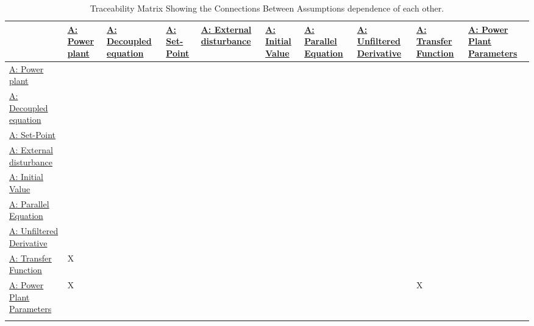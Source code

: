 \documentclass[12pt]{article}
\begin{document}
\begin{longtable}{l l l l l l l l l l}
\toprule
\textbf{} & \textbf{\hyperref[pwrPlant]{A: Power plant}} & \textbf{\hyperref[decoupled]{A: Decoupled equation}} & \textbf{\hyperref[setPoint]{A: Set-Point}} & \textbf{\hyperref[externalDistub]{A: External disturbance}} & \textbf{\hyperref[initialValue]{A: Initial Value}} & \textbf{\hyperref[parallelEq]{A: Parallel Equation}} & \textbf{\hyperref[unfilteredDerivative]{A: Unfiltered Derivative}} & \textbf{\hyperref[pwrPlantTxFnx]{A: Transfer Function}} & \textbf{\hyperref[dcGainTimeConst]{A: Power Plant Parameters}}
\\
\midrule
\endhead
\hyperref[pwrPlant]{A: Power plant} &  &  &  &  &  &  &  &  & 
\\
\hyperref[decoupled]{A: Decoupled equation} &  &  &  &  &  &  &  &  & 
\\
\hyperref[setPoint]{A: Set-Point} &  &  &  &  &  &  &  &  & 
\\
\hyperref[externalDistub]{A: External disturbance} &  &  &  &  &  &  &  &  & 
\\
\hyperref[initialValue]{A: Initial Value} &  &  &  &  &  &  &  &  & 
\\
\hyperref[parallelEq]{A: Parallel Equation} &  &  &  &  &  &  &  &  & 
\\
\hyperref[unfilteredDerivative]{A: Unfiltered Derivative} &  &  &  &  &  &  &  &  & 
\\
\hyperref[pwrPlantTxFnx]{A: Transfer Function} & X &  &  &  &  &  &  &  & 
\\
\hyperref[dcGainTimeConst]{A: Power Plant Parameters} & X &  &  &  &  &  &  & X & 
\\
\bottomrule
\caption{Traceability Matrix Showing the Connections Between Assumptions dependence of each other.}
\label{Table:TraceMatAvsA}
\end{longtable}
\end{document}
